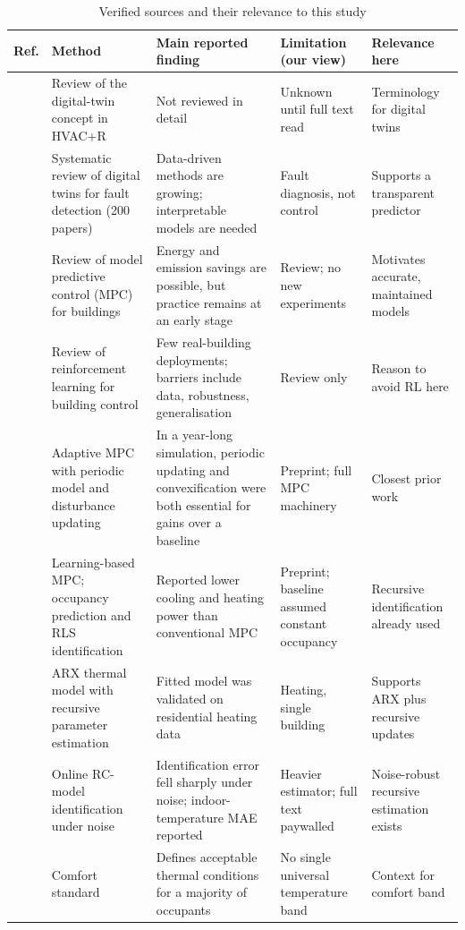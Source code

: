 \documentclass[conference]{IEEEtran}
\begin{document}
\begin{table}[!t]
\renewcommand{\arraystretch}{1.1}
\caption{Verified sources and their relevance to this study}
\label{tab:lit}
\centering\footnotesize
\begin{tabular}{p{}p{}p{}p{}p{}}
\hline
Ref. & Method & Main reported finding & Limitation (our view) & Relevance here\\
\hline
\cite{ibrahim2026} & Review of the digital-twin concept in HVAC+R & Not reviewed in detail & Unknown until full text read & Terminology for digital twins\\
\cite{hodavand2023} & Systematic review of digital twins for fault detection (200 papers) & Data-driven methods are growing; interpretable models are needed & Fault diagnosis, not control & Supports a transparent predictor\\
\cite{drgona2020} & Review of model predictive control (MPC) for buildings & Energy and emission savings are possible, but practice remains at an early stage & Review; no new experiments & Motivates accurate, maintained models\\
\cite{wang2020} & Review of reinforcement learning for building control & Few real-building deployments; barriers include data, robustness, generalisation & Review only & Reason to avoid RL here\\
\cite{zeng2021} & Adaptive MPC with periodic model and disturbance updating & In a year-long simulation, periodic updating and convexification were both essential for gains over a baseline & Preprint; full MPC machinery & Closest prior work\\
\cite{eini2019} & Learning-based MPC; occupancy prediction and RLS identification & Reported lower cooling and heating power than conventional MPC & Preprint; baseline assumed constant occupancy & Recursive identification already used\\
\cite{burger2017} & ARX thermal model with recursive parameter estimation & Fitted model was validated on residential heating data & Heating, single building & Supports ARX plus recursive updates\\
\cite{guo2025} & Online RC-model identification under noise & Identification error fell sharply under noise; indoor-temperature MAE reported & Heavier estimator; full text paywalled & Noise-robust recursive estimation exists\\
\cite{ashrae55} & Comfort standard & Defines acceptable thermal conditions for a majority of occupants & No single universal temperature band & Context for comfort band\\
\hline
\end{tabular}
\end{table}
\end{document}
